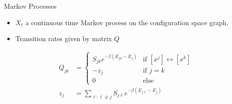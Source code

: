 \documentclass{beamer}
\begin{document}
\begin{frame}{Markov Processes}
\begin{itemize}
\item $X_t$ a continuous time Markov process on the configuration space graph.
\item Transition rates given by matrix $Q$
\end{itemize}
\begin{align}
  \label{eq:Qdef}
  Q_{jk} &=
  \begin{cases}
   S_{jk}e^{-\beta\left(E_{jk} - E_{j}\right)} & \text{if } [x^j] \leftrightarrow [x^k]  \\
   -z_j       & \text{if } j = k \\
   0 & \text{else}
  \end{cases} \\
z_j &= \sum_{\ell: \ell \neq j} S_{j\ell}e^{-\beta\left(E_{j\ell} - E_j\right)}
\end{align}
\end{frame}
\end{document}
